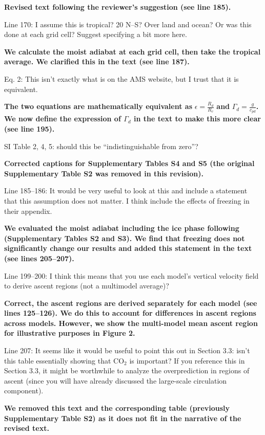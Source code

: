\documentclass[11pt]{article}
\begin{document}
\textbf{Revised text following the reviewer's suggestion (see line 185).}

Line 170: I assume this is tropical? 20 N--S? Over land and ocean? Or was this done at each grid cell? Suggest specifying a bit more here.

\textbf{We calculate the moist adiabat at each grid cell, then take the tropical average. We clarified this in the text (see line 187).}

Eq. 2: This isn't exactly what is on the AMS website, but I trust that it is equivalent.

\textbf{The two equations are mathematically equivalent as} \(\epsilon=\frac{R_d}{R_v}\) \textbf{and} \(\Gamma_d=\frac{g}{c_{pd}}\)\textbf{. We now define the expression of \(\Gamma_d\) in the text to make this more clear (see line 195).}

SI Table 2, 4, 5: should this be ``indistinguishable from zero''?

\textbf{Corrected captions for Supplementary Tables S4 and S5 (the original Supplementary Table S2 was removed in this revision).}

Line 185--186: It would be very useful to look at this and include a statement that this assumption does not matter. I think \cite{flannaghan_tropical_2014} include the effects of freezing in their appendix.

\textbf{We evaluated the moist adiabat including the ice phase following} \cite{flannaghan_tropical_2014} \textbf{ (Supplementary Tables S2 and S3). We find that freezing does not significantly change our results and added this statement in the text (see lines 205--207).}

Line 199--200: I think this means that you use each model's vertical velocity field to derive ascent regions (not a multimodel average)?

\textbf{Correct, the ascent regions are derived separately for each model (see lines 125--126). We do this to account for differences in ascent regions across models. However, we show the multi-model mean ascent region for illustrative purposes in Figure 2.}

Line 207: It seems like it would be useful to point this out in Section 3.3: isn't this table essentially showing that CO\(_2\) is important? If you reference this in Section 3.3, it might be worthwhile to analyze the overprediction in regions of ascent (since you will have already discussed the large-scale circulation component).

\textbf{We removed this text and the corresponding table (previously Supplementary Table S2) as it does not fit in the narrative of the revised text.}
\end{document}
